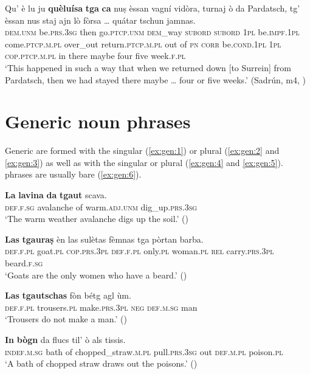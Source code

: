 \ea
\label{relqueluisa}
\gll  Qu' è lu ju \textbf{quèluísa} \textbf{tga} \textbf{ca} nuṣ èssan vagní vidòra, turnaj ò da Pardatsch, tg' èssan nus staj ajn lò fòrsa … quátar tschun jamnas.  \\
\textsc{dem.unm} be.\textsc{prs.3sg} then go.\textsc{ptcp.unm} \textsc{dem}\_way \textsc{subord} \textsc{subord} \textsc{1pl} be.\textsc{impf.1pl} come.\textsc{ptcp.m.pl} over\_out return.\textsc{ptcp.m.pl} out of \textsc{pn} \textsc{corr} be.\textsc{cond.1pl} \textsc{1pl} \textsc{cop.ptcp.m.pl} in there maybe {} four five week.\textsc{f.pl}   \\
\glt `This happened in such a way that when we returned down [to Surrein] from Pardatsch, then we had stayed there maybe … four or five weeks.' (Sadrún, m4, )
\z

\section{Generic noun phrases}\label{sec:3.8}
Generic  are formed with the  singular (\ref{ex:gen:1}) or plural (\ref{ex:gen:2} and \ref{ex:gen:3}) as well as with the  singular or plural (\ref{ex:gen:4} and \ref{ex:gen:5}).  phrases are usually bare (\ref{ex:gen:6}).

\ea
\label{ex:gen:1}
\gll \textbf{La} \textbf{lavina} \textbf{da} \textbf{tgaut} scava.\\
\textsc{def.f.sg} avalanche of warm.\textsc{adj.unm} dig\_up.\textsc{prs.3sg}\\
\glt `The warm weather avalanche digs up the soil.' ()
\z

\ea
\label{ex:gen:2}
\gll  \textbf{Las} \textbf{tgauraṣ} èn las sulètas fèmnas tga pòrtan barba.\\
     \textsc{def.f.pl} goat.\textsc{pl} \textsc{cop.prs.3pl} \textsc{def.f.pl} only.\textsc{pl} woman.\textsc{pl} \textsc{rel} carry.\textsc{prs.3pl} beard.\textsc{f.sg}\\
\glt `Goats are the only women who have a beard.' ()
\z

\ea\label{ex:gen:3}
\gll \textbf{Las} \textbf{tgautschas} fòn bétg agl ùm.\\
  \textsc{def.f.pl} trousers.\textsc{pl} make.\textsc{prs.3pl} \textsc{neg} \textsc{def.m.sg} man \\
\glt `Trousers do not make a man.' ()
\z

\ea\label{ex:gen:4}
\gll  \textbf{In} \textbf{bògn} da flucs til’ ò als tissis.\\
\textsc{indef.m.sg} bath of chopped\_straw.\textsc{m.pl} pull.\textsc{prs.3sg} out \textsc{def.m.pl} poison.\textsc{pl} \\
\glt `A bath of chopped straw draws out the poisons.' ()
\z

